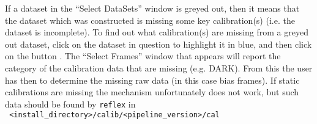 \documentclass[pdftex,a4paper,twoside,11pt]{article}
\begin{document}
\begin{enumerate}
If a dataset in the ``Select DataSets'' window is greyed out, then it
means that the dataset which was constructed is missing some key
calibration(s) (i.e. the dataset is incomplete). To find out what
calibration(s) are missing from a greyed out dataset, click on the
dataset in question to highlight it in blue, and then click on the
button . The ``Select Frames'' window
that appears will report the category of the calibration data that are missing (e.g. DARK). From this the user has then to
determine the missing raw data (in this case bias frames). If static
calibrations are missing the mechanism unfortunately does not work,
but such data should be found by {\tt reflex} in\\ {\tt
  <install\_directory>/calib/<pipeline\_version>/cal}



\end{enumerate}



\end{document}
